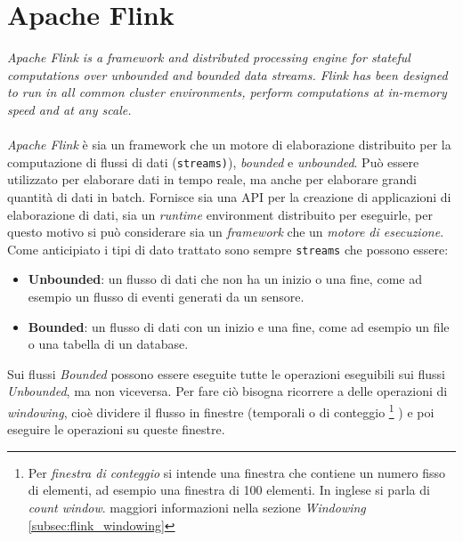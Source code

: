 \section{Apache Flink}
\label{sec:flink_overview}
\textit{Apache Flink is a framework and distributed processing engine for stateful computations over unbounded and bounded data streams. Flink has been designed to run in all common cluster environments, perform computations at in-memory speed and at any scale.}\cite*{flinkwebsite}\\\\
\textit{Apache Flink} è sia un framework che un motore di elaborazione distribuito per la computazione di flussi di dati (\texttt{streams)}), \textit{bounded} e \textit{unbounded}.
Può essere utilizzato per elaborare dati in tempo reale, ma anche per elaborare grandi quantità di dati in batch.
Fornisce sia una API per la creazione di applicazioni di elaborazione di dati, sia un \textit{runtime} environment distribuito per eseguirle,
per questo motivo si può considerare sia un \textit{framework} che un \textit{motore di esecuzione}.
Come anticipiato i tipi di dato trattato sono sempre \texttt{streams} che possono essere:
\begin{itemize}
    \item \textbf{Unbounded}: un flusso di dati che non ha un inizio o una fine, come ad esempio un flusso di eventi generati da un sensore.
    \item \textbf{Bounded}: un flusso di dati con un inizio e una fine, come ad esempio un file o una tabella di un database.
\end{itemize}
Sui flussi \textit{Bounded} possono essere eseguite tutte le operazioni eseguibili sui flussi \textit{Unbounded}, ma non viceversa.
Per fare ciò bisogna ricorrere a delle operazioni di \textit{windowing}, cioè dividere il flusso in finestre (temporali o di conteggio 
\footnote{Per \textit{finestra di conteggio} si intende una finestra che contiene un numero fisso di elementi, ad esempio una finestra di 100 elementi.
In inglese si parla di \textit{count window}. maggiori informazioni nella sezione \textit{Windowing} \ref{subsec:flink_windowing}}
) e poi eseguire le operazioni su queste finestre.

